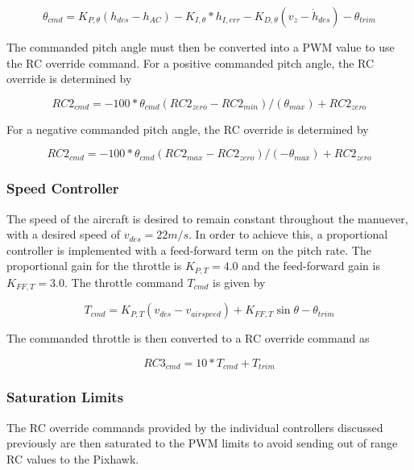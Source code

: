 \documentclass{aiaa}
\begin{document}
\begin{equation} \theta_{cmd} = K_{P,\theta}(h_{des} - h_{AC}) - K_{I,\theta}*h_{I,err} - K_{D,\theta}(v_z - \dot{h}_{des}) - \theta_{trim}
\end{equation}


The commanded pitch angle must then be converted into a PWM value to use the RC override command. For a positive commanded pitch angle, the RC override is determined by

\begin{equation}
RC2_{cmd} = -100*\theta_{cmd}(RC2_{zero} - RC2_{min})/(\theta_{max}) + RC2_{zero}
\end{equation}

For a negative commanded pitch angle, the RC override is determined by

\begin{equation}
RC2_{cmd} = -100*\theta_{cmd}(RC2_{max} - RC2_{zero})/(-\theta_{max}) + RC2_{zero}
\end{equation}

\subsubsection{Speed Controller}

The speed of the aircraft is desired to remain constant throughout the manuever, with a desired speed of $v_{des} = 22 m/s$. In order to achieve this, a proportional controller is implemented with a feed-forward term on the pitch rate. The proportional gain for the throttle is $K_{P,T} = 4.0$ and the feed-forward gain is $K_{FF,T} = 3.0$. The throttle command $T_{cmd}$ is given by

\begin{equation}
T_{cmd} = K_{P,T}(v_{des} - v_{airspeed}) + K_{FF,T}\sin{\theta - \theta_{trim}}
\end{equation}

The commanded throttle is then converted to a RC override command as

\begin{equation}
RC3_{cmd} = 10*T_{cmd} + T_{trim}
\end{equation}




\subsubsection{Saturation Limits}


The RC override commands provided by the individual controllers discussed previously are then saturated to the PWM limits to avoid sending out of range RC values to the Pixhawk.
\end{document}
